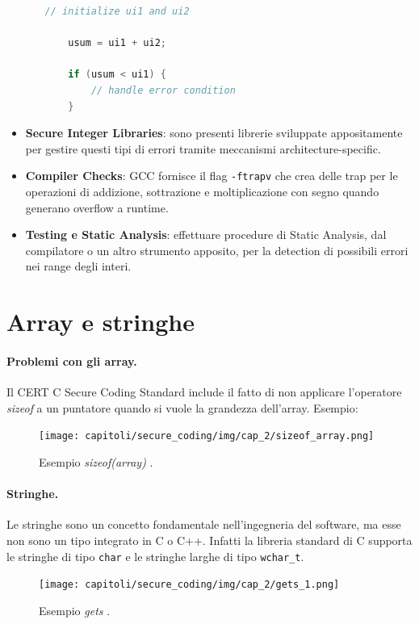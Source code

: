 \begin{itemize}
\begin{itemize}
\begin{lstlisting}[language=C]
    // initialize ui1 and ui2

    usum = ui1 + ui2;

    if (usum < ui1) {
        // handle error condition
    }
                    \end{lstlisting}
          \end{itemize}
    \item \textbf{Secure Integer Libraries}:
          sono presenti librerie sviluppate appositamente per gestire questi
          tipi di errori tramite meccanismi architecture-specific.
    \item \textbf{Compiler Checks}:
          GCC fornisce il flag \verb|-ftrapv| che crea delle trap per le
          operazioni di addizione, sottrazione e moltiplicazione con segno
          quando generano overflow a runtime.
    \item \textbf{Testing e Static Analysis}:
          effettuare procedure di Static Analysis,
          dal compilatore o un altro strumento apposito,
          per la detection di possibili errori nei range degli interi.
\end{itemize}

\section{Array e stringhe}

\paragraph{Problemi con gli array.}
Il  CERT C Secure Coding Standard include il fatto di non applicare
l'operatore \textit{sizeof} a un puntatore quando si vuole la grandezza dell'array.
Esempio:

\begin{figure}[H]
    \centering
    \texttt{[image: capitoli/secure\_coding/img/cap\_2/sizeof\_array.png]}
    \caption{Esempio \textit{sizeof(array)} .}\label{fig:sizeof_array}
\end{figure}

\paragraph{Stringhe.}
Le stringhe sono un concetto fondamentale nell'ingegneria del software,
ma esse non sono un tipo integrato in C o C++. Infatti la libreria standard di C
supporta le stringhe di tipo \verb|char| e le stringhe larghe di tipo \verb|wchar_t|.

\begin{figure}[H]
    \centering
    \texttt{[image: capitoli/secure\_coding/img/cap\_2/gets\_1.png]}
    \caption{Esempio \textit{gets} .}\label{fig:gets}
\end{figure}

